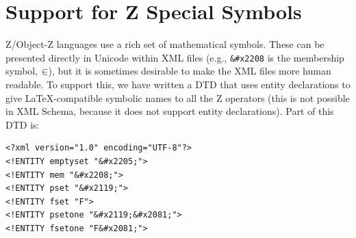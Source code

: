 \documentclass{llncs}  %
\newcommand{\AFont}[1]{\texttt{#1}}
\begin{document}




\section{Support for Z Special Symbols}

Z/Object-Z languages use a rich set of mathematical symbols.  These
can be presented directly in Unicode within XML files (e.g., \verb!&#x2208!
is the membership symbol, $\in$), but it is sometimes desirable to make
the XML files more human readable.  To support this, we have written a DTD
that uses entity declarations to give \LaTeX-compatible symbolic names to
all the Z operators (this is not possible in XML Schema, because it does
not support entity declarations).  Part of this DTD is:

\begin{small}
\begin{verbatim} 
<?xml version="1.0" encoding="UTF-8"?>
<!ENTITY emptyset "&#x2205;">
<!ENTITY mem "&#x2208;">
<!ENTITY pset "&#x2119;">
<!ENTITY fset "F">
<!ENTITY psetone "&#x2119;&#x2081;">
<!ENTITY fsetone "F&#x2081;">
\end{verbatim}
\end{small}
\end{document}
